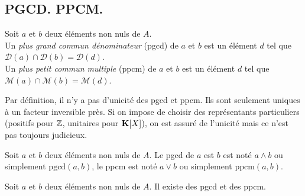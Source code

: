 \subsection{PGCD. PPCM.}
\begin{defi}
 Soit $a$ et $b$ deux éléments non nuls de $A$.\\ Un \emph{plus grand commun dénominateur} (pgcd) de $a$ et $b$ est un élément $d$ tel que $\mathcal D(a)\cap \mathcal D(b)=\mathcal D(d)$.\\ Un \emph{plus petit commun multiple} (ppcm) de $a$ et $b$ est un élément $d$ tel que $\mathcal M(a)\cap \mathcal M(b)=\mathcal M(d)$.
\end{defi}
\begin{rem}
 Par définition, il n'y a pas d'unicité des pgcd et ppcm. Ils sont seulement uniques à un facteur inversible près. Si on impose de choisir des représentants particuliers (positifs pour $\mathbb{Z}$, unitaires pour $\mathbf{K}[X]$), on est assuré de l'unicité mais ce n'est pas toujours judicieux.
\end{rem}
\begin{nota}
 Soit $a$ et $b$ deux éléments non nuls de $A$. Le pgcd de $a$ est $b$ est noté $a\wedge b$ ou simplement $\text{pgcd}(a,b)$, le ppcm est noté $a\vee b$ ou simplement $\text{ppcm}(a,b)$.
\end{nota}
\begin{prop}
 Soit $a$ et $b$ deux éléments non nuls de $A$. Il existe des pgcd et des ppcm.
\end{prop}
